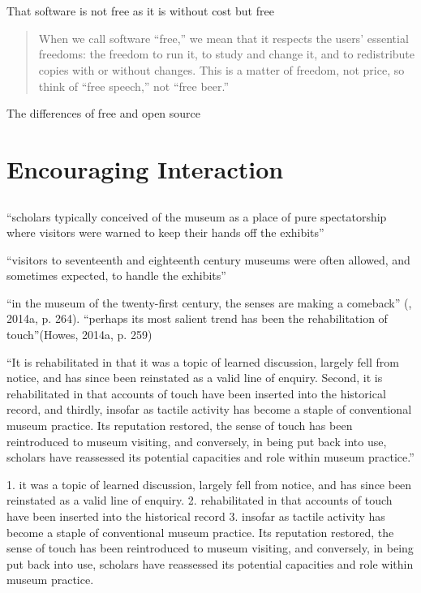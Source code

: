 \section{\cite{stallman_why_2007}}

That software is not free as it is without cost but free

\begin{quotation}
    When we call software “free,” we mean that it respects the users' essential freedoms: the freedom to run it, to study and change it, and to redistribute copies with or without changes. This is a matter of freedom, not price, so think of “free speech,” not “free beer.”
\end{quotation}


The differences of free and open source


\section{Encouraging Interaction}

\subsection{\cite{candlin_rehabilitating_2017}}

``scholars typically conceived of the museum as a place of pure
spectatorship where visitors were warned to keep their hands off the exhibits''

``visitors to seventeenth and eighteenth century museums were often allowed,
and sometimes expected, to handle the exhibits''

“in the museum of the twenty-first
century, the senses are making a comeback” (\citep[264]{howes_introduction_2014}, 2014a, p. 264).
“perhaps its most salient trend has been the rehabilitation of touch”(Howes, 2014a, p. 259)

``It is rehabilitated in that it was a topic of learned discussion, largely fell from notice, and has since been reinstated as a valid line of enquiry. Second, it is rehabilitated in that accounts of touch have been inserted into the historical record, and thirdly, insofar as tactile activity has become a staple of conventional museum practice. Its reputation restored, the sense of touch has been reintroduced to museum visiting, and conversely, in being put back into use, scholars have reassessed its potential capacities and role within museum practice.''


1. it was a topic of learned discussion, largely fell from notice, and has since been reinstated as a valid line of enquiry. 
2. rehabilitated in that accounts of touch have been inserted into the historical record
3. insofar as tactile activity has become a staple of conventional museum practice. Its reputation restored, the sense of touch has been reintroduced to museum visiting, and conversely, in being put back into use, scholars have reassessed its potential capacities and role within museum practice.





